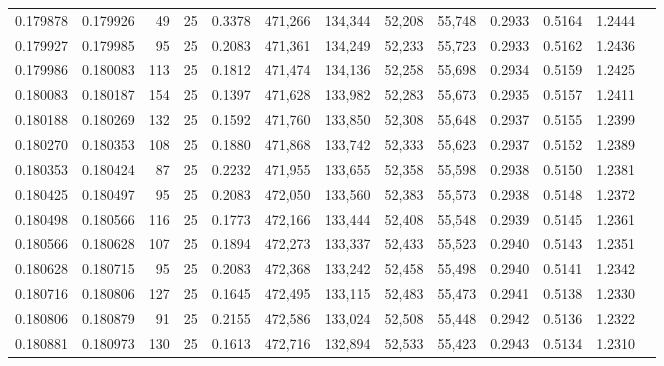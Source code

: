 \begin{tabular}{rrrrrrrrrrrrr}
0.179878 & 0.179926 &    49 &  25 &                                     0.3378 & 471,266 & 134,344 &  52,208 &  55,748 & 0.2933 & 0.5164 & 1.2444 \\
0.179927 & 0.179985 &    95 &  25 &                                     0.2083 & 471,361 & 134,249 &  52,233 &  55,723 & 0.2933 & 0.5162 & 1.2436 \\
0.179986 & 0.180083 &   113 &  25 &                                     0.1812 & 471,474 & 134,136 &  52,258 &  55,698 & 0.2934 & 0.5159 & 1.2425 \\
0.180083 & 0.180187 &   154 &  25 &                                     0.1397 & 471,628 & 133,982 &  52,283 &  55,673 & 0.2935 & 0.5157 & 1.2411 \\
0.180188 & 0.180269 &   132 &  25 &                                     0.1592 & 471,760 & 133,850 &  52,308 &  55,648 & 0.2937 & 0.5155 & 1.2399 \\
0.180270 & 0.180353 &   108 &  25 &                                     0.1880 & 471,868 & 133,742 &  52,333 &  55,623 & 0.2937 & 0.5152 & 1.2389 \\
0.180353 & 0.180424 &    87 &  25 &                                     0.2232 & 471,955 & 133,655 &  52,358 &  55,598 & 0.2938 & 0.5150 & 1.2381 \\
0.180425 & 0.180497 &    95 &  25 &                                     0.2083 & 472,050 & 133,560 &  52,383 &  55,573 & 0.2938 & 0.5148 & 1.2372 \\
0.180498 & 0.180566 &   116 &  25 &                                     0.1773 & 472,166 & 133,444 &  52,408 &  55,548 & 0.2939 & 0.5145 & 1.2361 \\
0.180566 & 0.180628 &   107 &  25 &                                     0.1894 & 472,273 & 133,337 &  52,433 &  55,523 & 0.2940 & 0.5143 & 1.2351 \\
0.180628 & 0.180715 &    95 &  25 &                                     0.2083 & 472,368 & 133,242 &  52,458 &  55,498 & 0.2940 & 0.5141 & 1.2342 \\
0.180716 & 0.180806 &   127 &  25 &                                     0.1645 & 472,495 & 133,115 &  52,483 &  55,473 & 0.2941 & 0.5138 & 1.2330 \\
0.180806 & 0.180879 &    91 &  25 &                                     0.2155 & 472,586 & 133,024 &  52,508 &  55,448 & 0.2942 & 0.5136 & 1.2322 \\
0.180881 & 0.180973 &   130 &  25 &                                     0.1613 & 472,716 & 132,894 &  52,533 &  55,423 & 0.2943 & 0.5134 & 1.2310 \\

\end{tabular}
